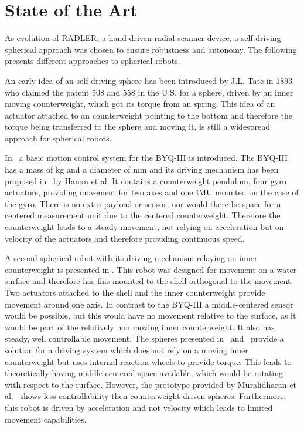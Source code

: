 \section{State of the Art}
\label{sec:stateOfTheArt}
As evolution of RADLER, a hand-driven radial scanner device, a self-driving spherical approach was chosen to ensure robustness and autonomy.
The following presents different approaches to spherical robots.

An early idea of an self-driving sphere has been introduced by J.L. Tate in 1893 who claimed the patent  508 and 558 in the U.S. for a sphere, driven by an inner moving counterweight, which got its torque from an spring.
This idea of an actuator attached to an counterweight pointing to the bottom and therefore the torque being transferred to the sphere and moving it, is still a widespread approach for spherical robots.

In~\cite{soa1} a basic motion control system for the BYQ-III is introduced.
The BYQ-III has a mass of \unit[25]{kg} and a diameter of \unit[600]{mm} and its driving mechanism has been proposed in~\cite{soa2} by Hanxu et al.
It contains  a counterweight pendulum, four gyro actuators, providing movement for two axes and one IMU mounted on the case of the gyro.
There is no extra payload or sensor, nor would there be space for a centered measurement unit due to the centered counterweight.
Therefore the counterweight leads to a steady movement, not relying on acceleration but on velocity of the actuators and therefore providing continuous speed.

A second spherical robot with its driving mechanism relaying on inner counterweight is presented in \cite{soa3}.
This robot was designed for movement on a water surface and therefore has fins mounted to the shell orthogonal to the movement.
Two actuators attached to the shell and the inner counterweight provide movement around one axis.
In contrast to the BYQ-III a middle-centered sensor would be possible, but this would have no movement relative to the surface, as it would be part of the relatively non moving inner counterweight.
It also has steady, well controllable movement. 
The spheres presented in~\cite{soa4} and~\cite{soa5} provide a solution for a driving system which does not rely on a moving inner counterweight but uses internal reaction wheels to provide torque.
This leads to theoretically having middle-centered space available, which would be rotating with respect to the surface.
However, the prototype provided by Muralidharan et al.~\cite{soa4} shows less controllability then counterweight driven spheres. Furthermore, this robot is driven by acceleration and not velocity which leads to limited movement capabilities.

